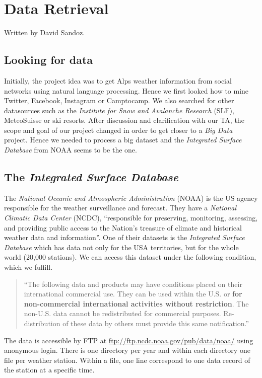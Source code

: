 \section{Data Retrieval}
Written by David Sandoz.
\subsection{Looking for data}
Initially, the project idea was to get Alps weather information from social networks using natural language processing. Hence we first looked how to mine Twitter, Facebook, Instagram or Camptocamp. We also searched for other datasources such as the \emph{Institute for Snow and Avalanche Research} (SLF), MeteoSuisse or ski resorts. After discussion and clarification with our TA, the scope and goal of our project changed in order to get closer to a \emph{Big Data} project. Hence we needed to process a big dataset and the \emph{Integrated Surface Database} from NOAA seems to be the one.

\subsection{The \emph{Integrated Surface Database}}
The \emph{National Oceanic and Atmospheric Administration} (NOAA) is the US agency responsible for the weather surveillance and forecast. They have a \emph{National Climatic Data Center} (NCDC), “responsible for preserving, monitoring, assessing, and providing public access to the Nation's treasure of climate and historical weather data and information”. One of their datasets is the \emph{Integrated Surface Database} which has data not only for the USA territories, but for the whole world (20,000 stations). We can access this dataset under the following condition, which we fulfill.
\begin{quote}
“The following data and products may have conditions placed on their international commercial use. They can be used within the U.S. or \textbf{for non-commercial international activities without restriction}. The non-U.S. data cannot be redistributed for commercial purposes. Re-distribution of these data by others must provide this same notification.”
\end{quote}
The data is accessible by FTP at \url{ftp://ftp.ncdc.noaa.gov/pub/data/noaa/} using anonymous login. There is one directory per year and within each directory one file per weather station. Within a file, one line correspond to one data record of the station at a specific time.

